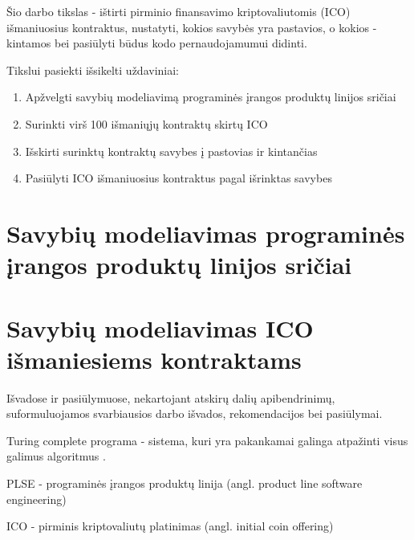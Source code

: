\documentclass{VUMIFPSkursinis}
\begin{document}
Šio darbo tikslas - ištirti pirminio finansavimo kriptovaliutomis (ICO) išmaniuosius kontraktus, nustatyti, kokios savybės yra pastavios, o kokios - kintamos bei pasiūlyti būdus kodo pernaudojamumui didinti. 

Tikslui pasiekti išsikelti uždaviniai:
\begin{enumerate}
\item Apžvelgti savybių modeliavimą programinės įrangos produktų linijos sričiai 
\item Surinkti virš 100 išmaniųjų kontraktų skirtų ICO
\item Išskirti surinktų kontraktų savybes į pastovias ir kintančias
\item Pasiūlyti ICO išmaniuosius kontraktus pagal išrinktas savybes
\end{enumerate}

\section{Savybių modeliavimas programinės įrangos produktų linijos sričiai}
\section{Savybių modeliavimas ICO išmaniesiems kontraktams}





Išvadose ir pasiūlymuose, nekartojant atskirų dalių apibendrinimų,
suformuluojamos svarbiausios darbo išvados, rekomendacijos bei pasiūlymai.



\printbibliography[heading=bibintoc] %

Turing complete programa - sistema, kuri yra pakankamai galinga atpažinti visus galimus algoritmus \cite{Teller1994}. 

PLSE - programinės įrangos produktų linija (angl. product line software engineering)

ICO - pirminis kriptovaliutų platinimas (angl. initial coin offering)

%
\end{document}
